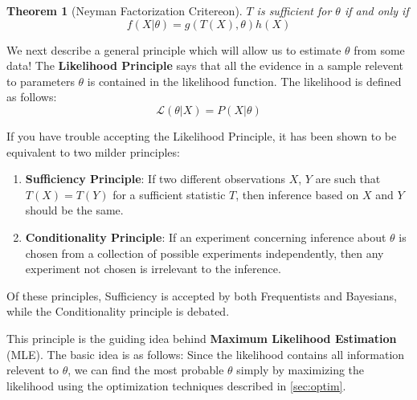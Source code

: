 \documentclass[]{article}
\theoremstyle{mattstyle}
\newtheorem{theorem}{Theorem}[section]
\theoremstyle{definition}
\begin{document}
\begin{theorem}[Neyman Factorization Critereon]
	$T$ is sufficient for $\theta$ if and only if $$f(X|\theta) = g(T(X),\theta)h(X)$$
\end{theorem}

We next describe a general principle which will allow us to estimate $\theta$ from some data! The \textbf{Likelihood Principle} says that all the evidence in a sample relevent to parameters \(\theta\) is contained in the likelihood function. The likelihood is defined as follows:
$$ \mathcal{L}(\theta | X) = P(X | \theta)$$

If you have trouble accepting the Likelihood Principle, it has been shown to be equivalent to two milder principles:
\begin{enumerate}
	\item \textbf{Sufficiency Principle}: If two different observations $X$, $Y$ are such that $T(X) = T(Y)$ for a sufficient statistic $T$, then inference based on $X$ and $Y$ should be the same.
	\item \textbf{Conditionality Principle}: If an experiment concerning inference about $\theta$ is chosen from a collection of
	possible experiments independently, then any experiment not chosen is irrelevant to the inference.
\end{enumerate}

Of these principles, Sufficiency is accepted by both Frequentists and Bayesians, while the Conditionality principle is debated. 

This principle is the guiding idea behind \textbf{Maximum Likelihood Estimation} (MLE). The basic idea is as follows: Since the likelihood contains all information relevent to $\theta$, we can find the most probable $\theta$ simply by maximizing the likelihood using the optimization techniques described in \ref{sec:optim}. 

\newpage
\end{document}
